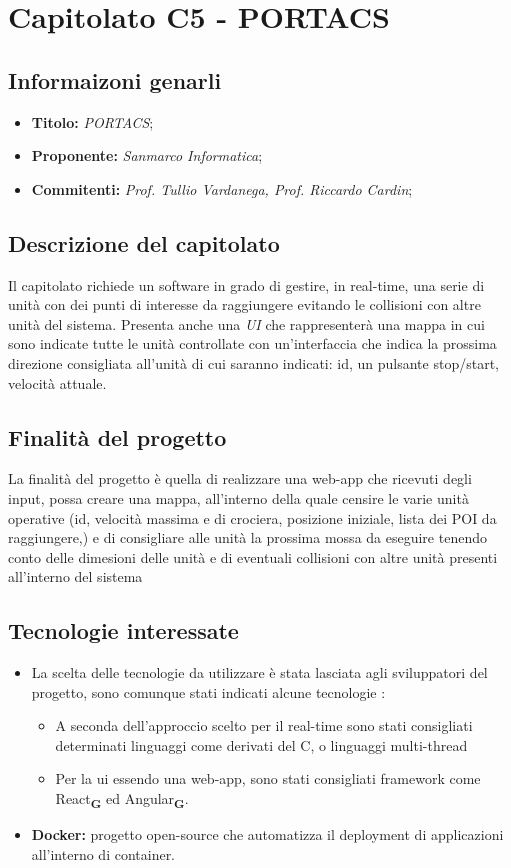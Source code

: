 \section{Capitolato C5 - PORTACS}
\subsection{Informaizoni genarli}
\begin{itemize}
    \item \textbf{Titolo:} \textit{PORTACS};
    \item \textbf{Proponente:} \textit{Sanmarco Informatica};
    \item \textbf{Commitenti:} \textit{Prof. Tullio Vardanega, Prof. Riccardo Cardin};
\end{itemize}
\subsection{Descrizione del capitolato}
Il capitolato richiede un software in grado di gestire, in real-time, una serie di unità con dei punti di interesse da raggiungere evitando le collisioni con altre unità del sistema.
Presenta anche una \textit{UI} che rappresenterà una mappa in cui sono indicate tutte le unità controllate con un'interfaccia che indica la prossima direzione consigliata
all'unità di cui saranno indicati: id, un pulsante stop/start, velocità attuale.
\subsection{Finalità del progetto}
La finalità del progetto è quella di realizzare una web-app che ricevuti degli input, possa creare una mappa, all'interno della quale censire le varie unità operative
(id, velocità massima e di crociera, posizione iniziale, lista dei POI da raggiungere,) e di consigliare
alle unità la prossima mossa da eseguire tenendo conto delle dimesioni delle unità e di eventuali collisioni con altre unità presenti all'interno del sistema
\subsection{Tecnologie interessate}
\begin{itemize}
    \item La scelta delle tecnologie da utilizzare è stata lasciata agli sviluppatori del progetto, sono comunque stati indicati alcune tecnologie :
          \begin{itemize}
              \item A seconda dell'approccio scelto per il real-time sono stati consigliati determinati linguaggi come derivati del C, o linguaggi multi-thread
              \item Per la ui essendo una web-app, sono stati consigliati framework come React\textsubscript{\textbf{G}} ed Angular\textsubscript{\textbf{G}}.
          \end{itemize}
    \item \textbf{Docker:} progetto open-source che automatizza il deployment di applicazioni all’interno di container.
\end{itemize}
